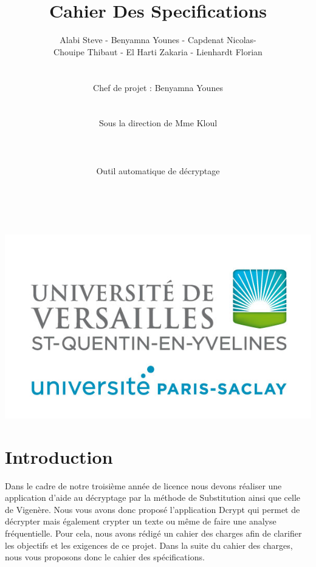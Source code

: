 \documentclass[a4]{article}
\begin{document}
	\title{\Huge{\textbf{Cahier Des Specifications}}}
	\author{Alabi Steve - Benyamna Younes - Capdenat Nicolas- \\
		Chouipe Thibaut - El Harti Zakaria - Lienhardt Florian \\ \\ \\
		Chef de projet : Benyamna Younes \\ \\ \\ 
		Sous la direction de Mme Kloul \\ \\ \\ \\
		Outil automatique de décryptage \\ \\ \\}
		

	\begin{titlepage}
		\maketitle
		\vspace{20em}
		\begin{center}\includegraphics{logo_uvsq.jpg}\end{center}
	\end{titlepage}
	\section{Introduction}
Dans le cadre de notre troisième année de licence nous devons réaliser une application d'aide au
décryptage par la méthode de Substitution ainsi que celle de Vigenère.
Nous vous avons donc proposé l'application Dcrypt qui permet de décrypter 
mais également crypter un texte ou même de faire une analyse fréquentielle.
Pour cela, nous avons rédigé un cahier des charges afin de clarifier les objectifs et les 
exigences de ce projet. Dans la suite du cahier des charges, nous vous proposons donc
le cahier des spécifications.\\
\end{document}
